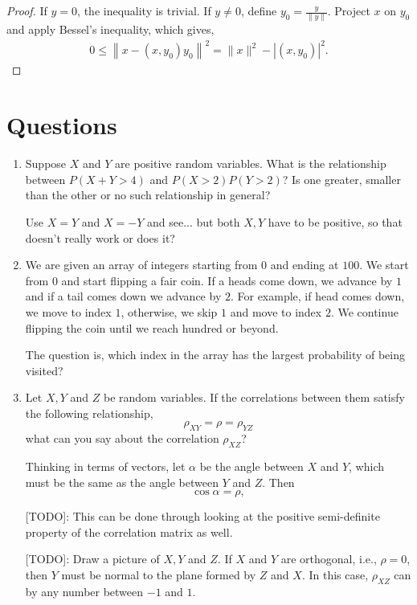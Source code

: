\documentclass{amsart}
\theoremstyle{plain}
\numberwithin{equation}{section}
\begin{document}
\begin{proof}
If $y=0$, the inequality is trivial. If $y\neq 0$, define
$y_0 = \frac{y}{\|y\|}$. Project $x$ on $y_0$ and apply
Bessel's inequality, which gives,
\begin{align*}
0 \leq \left\|x - (x, y_0) y_0\right\|^2 = 
\|x\|^2 - |(x, y_0)|^2.
\end{align*}
\end{proof}




\section*{Questions}
\begin{enumerate}
\item Suppose $X$ and $Y$ are positive 
random variables. What is the relationship between
$P(X+Y>4)$ and $P(X>2)P(Y>2)$? Is one greater, smaller
than the other or no such relationship in general?

Use $X=Y$ and $X=-Y$ and see... but both $X,Y$ 
have to be positive, so that doesn't really work or does it?

\item We are given an array of integers starting 
from $0$ and ending at $100$. We start from $0$ and 
start flipping a fair coin. If a heads come down, 
we advance by $1$ and if a tail comes down 
we advance by $2$. For example, if head comes down, we move
to index $1$, otherwise, we skip $1$ and move to index $2$. 
We continue flipping the coin until we 
reach hundred or beyond. 

The question is, which index in the array has the 
largest probability of being visited?  


 
\item Let $X, Y$ and $Z$ be random 
variables. If the correlations between 
them satisfy the following relationship,
$$\rho_{XY} = \rho = \rho_{YZ}$$
what can you say about the correlation
$\rho_{XZ}$?

Thinking in terms of vectors, let $\alpha$ be 
the angle between $X$ and $Y$, which must be the 
same as the angle between $Y$ and $Z$. Then
$$\cos \alpha = \rho,$$

[TODO]: This can be done through looking at
the positive semi-definite property of the correlation matrix as 
well.

[TODO]: Draw a picture of $X, Y$ and $Z$.
If $X$ and $Y$ are orthogonal, i.e., $\rho = 0$, 
then $Y$ must be normal to the plane 
formed by $Z$ and $X$. In this case, $\rho_{XZ}$ can 
by any number between $-1$ and $1$. 


\end{enumerate}
\end{document}

